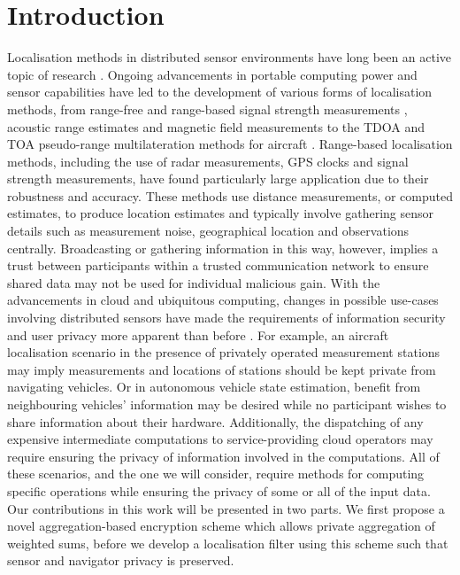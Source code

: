 \documentclass[twocolumn]{autart}
\begin{document}
\section{Introduction}
Localisation methods in distributed sensor environments have long been an active topic of research \cite{pierceIntroductionLoran1946,liContributedReviewSourcelocalization2016}. Ongoing advancements in portable computing power and sensor capabilities have led to the development of various forms of localisation methods, from range-free and range-based signal strength measurements \cite{wangConvexCombinationSource2018,heRangeFreeLocalizationSchemes}, acoustic range estimates \cite{beutlerNewNonlinearFiltering2004} and magnetic field measurements \cite{sieblerLocalizationMagneticField2020} to the TDOA and TOA pseudo-range multilateration methods for aircraft \cite{liContributedReviewSourcelocalization2016}. Range-based localisation methods, including the use of radar measurements, GPS clocks and signal strength measurements, have found particularly large application due to their robustness and accuracy. These methods use distance measurements, or computed estimates, to produce location estimates and typically involve gathering sensor details such as measurement noise, geographical location and observations centrally. Broadcasting or gathering information in this way, however, implies a trust between participants within a trusted communication network to ensure shared data may not be used for individual malicious gain. With the advancements in cloud and ubiquitous computing, changes in possible use-cases involving distributed sensors have made the requirements of information security and user privacy more apparent than before \cite{brennerSecretProgramExecution2011,renSecurityChallengesPublic2012}. For example, an aircraft localisation scenario in the presence of privately operated measurement stations may imply measurements and locations of stations should be kept private from navigating vehicles. Or in autonomous vehicle state estimation, benefit from neighbouring vehicles' information may be desired while no participant wishes to share information about their hardware. Additionally, the dispatching of any expensive intermediate computations to service-providing cloud operators may require ensuring the privacy of information involved in the computations. All of these scenarios, and the one we will consider, require methods for computing specific operations while ensuring the privacy of some or all of the input data. Our contributions in this work will be presented in two parts. We first propose a novel aggregation-based encryption scheme which allows private aggregation of weighted sums, before we develop a localisation filter using this scheme such that sensor and navigator privacy is preserved.
\end{document}
